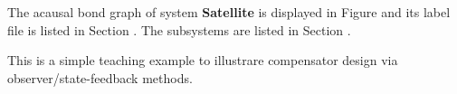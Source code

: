 

   The acausal bond graph of system \textbf{Satellite} is
   displayed in Figure  and its label
   file is listed in Section .
   The subsystems are listed in Section .


This is a simple teaching example to illustrare compensator design via
observer/state-feedback methods.

